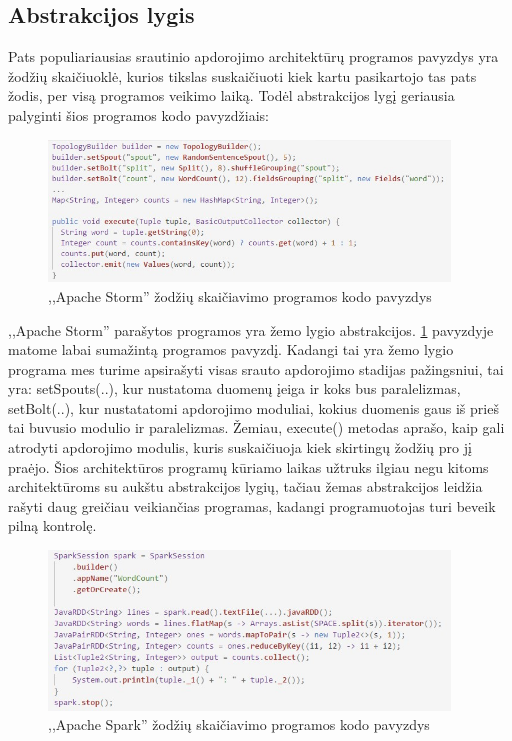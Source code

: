\documentclass{VUMIFPSkursinis}
\begin{document}
\subsection{Abstrakcijos lygis}
Pats populiariausias srautinio apdorojimo architektūrų programos pavyzdys yra žodžių skaičiuoklė, kurios tikslas suskaičiuoti kiek 
kartu pasikartojo tas pats žodis, per visą programos veikimo laiką. Todėl abstrakcijos lygį geriausia palyginti šios programos kodo pavyzdžiais\cite{petr2016}:

\begin{figure}[!htbp]
    \centering
    \includegraphics[width=0.95\textwidth]{img/StormAPI.jpg}
    \caption{,,Apache Storm'' žodžių skaičiavimo programos kodo pavyzdys}
    \label{fig:stormapi}
\end{figure} \par

,,Apache Storm'' parašytos programos yra žemo lygio abstrakcijos. \ref{fig:stormapi} pavyzdyje matome labai sumažintą programos pavyzdį. 
Kadangi tai yra žemo lygio programa mes turime apsirašyti visas srauto apdorojimo stadijas pažingsniui, tai yra: setSpouts(..), 
kur nustatoma duomenų įeiga ir koks bus paralelizmas, setBolt(..), kur nustatatomi apdorojimo moduliai, kokius duomenis gaus iš 
prieš tai buvusio modulio ir paralelizmas. Žemiau, execute() metodas aprašo, kaip gali atrodyti apdorojimo modulis, kuris suskaičiuoja 
kiek skirtingų žodžių pro jį praėjo. Šios architektūros programų kūriamo laikas užtruks ilgiau negu kitoms architektūroms su aukštu 
abstrakcijos lygių, tačiau žemas abstrakcijos leidžia rašyti daug greičiau veikiančias programas, kadangi programuotojas turi beveik pilną kontrolę.

\begin{figure}[!htbp]
    \centering
    \includegraphics[width=0.95\textwidth]{img/SparkAPI.jpg}
    \caption{,,Apache Spark'' žodžių skaičiavimo programos kodo pavyzdys}
    \label{fig:sparkapi}
\end{figure} \par
\end{document}
